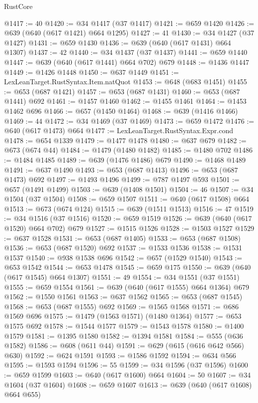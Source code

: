 \begin{lexlean}{RustCore}
\begin{coremodule}
@1417 := 40
@1420 := @34 @1417 (@37 @1417)
@1421 := @659 @1420
@1426 := @639 (@640 (@617 @1421) @664 @1295)
@1427 := 41
@1430 := @34 @1427 (@37 @1427)
@1431 := @659 @1430
@1436 := @639 (@640 (@617 @1431) @664 @1307)
@1437 := 42
@1440 := @34 @1437 (@37 @1437)
@1441 := @659 @1440
@1447 := @639 (@640 (@617 @1441) @664 @702) @679
@1448 := @1436 @1447
@1449 := @1426 @1448
@1450 := @637 @1449
@1451 := LexLeanTarget.RustSyntax.Item.natQuot
@1453 := @648 (@683 @1451)
@1455 := @653 (@687 @1421)
@1457 := @653 (@687 @1431)
@1460 := @653 (@687 @1441) @692
@1461 := @1457 @1460
@1462 := @1455 @1461
@1464 := @1453 @1462 @696
@1466 := @657 (@1450 @1464)
@1468 := @639 (@1416 @1466)
@1469 := 44
@1472 := @34 @1469 (@37 @1469)
@1473 := @659 @1472
@1476 := @640 (@617 @1473) @664
@1477 := LexLeanTarget.RustSyntax.Expr.cond
@1478 := @654 @1339
@1479 := @1477 @1478
@1480 := @637 @679
@1482 := @673 (@674 @44)
@1484 := @1479 (@1480 @1482)
@1485 := @1480 @702
@1486 := @1484 @1485
@1489 := @639 (@1476 @1486) @679
@1490 := @1468 @1489
@1491 := @637 @1490
@1493 := @653 (@687 @1413)
@1496 := @653 (@687 @1473) @692
@1497 := @1493 @1496
@1499 := @787 @1497 @593
@1501 := @657 (@1491 @1499)
@1503 := @639 (@1408 @1501)
@1504 := 46
@1507 := @34 @1504 (@37 @1504)
@1508 := @659 @1507
@1511 := @640 (@617 @1508) @664
@1513 := @673 (@674 @124)
@1515 := @639 (@1511 @1513)
@1516 := 47
@1519 := @34 @1516 (@37 @1516)
@1520 := @659 @1519
@1526 := @639 (@640 (@617 @1520) @664 @702) @679
@1527 := @1515 @1526
@1528 := @1503 @1527
@1529 := @637 @1528
@1531 := @653 (@687 @1405)
@1533 := @653 (@687 @1508)
@1536 := @653 (@687 @1520) @692
@1537 := @1533 @1536
@1538 := @1531 @1537
@1540 := @938 @1538 @696
@1542 := @657 (@1529 @1540)
@1543 := @653 @1542
@1544 := @653 @1478
@1545 := @659 @175
@1550 := @639 (@640 (@617 @1545) @664 @1307)
@1551 := 49
@1554 := @34 @1551 (@37 @1551)
@1555 := @659 @1554
@1561 := @639 (@640 (@617 @1555) @664 @1364) @679
@1562 := @1550 @1561
@1563 := @637 @1562
@1565 := @653 (@687 @1545)
@1568 := @653 (@687 @1555) @692
@1569 := @1565 @1568
@1571 := @686 @1569 @696
@1575 := @1479 (@1563 @1571) (@1480 @1364)
@1577 := @653 @1575 @692
@1578 := @1544 @1577
@1579 := @1543 @1578
@1580 := @1400 @1579
@1581 := @1395 @1580
@1582 := @1394 @1581
@1584 := @555 (@636 @1582)
@1586 := @608 (@611 @44)
@1591 := @629 (@615 (@616 @642 @566) @630)
@1592 := @624 @1591
@1593 := @1586 @1592
@1594 := @634 @566
@1595 := @1593 @1594
@1596 := 55
@1599 := @34 @1596 (@37 @1596)
@1600 := @659 @1599
@1603 := @640 (@617 @1600) @664
@1604 := 50
@1607 := @34 @1604 (@37 @1604)
@1608 := @659 @1607
@1613 := @639 (@640 (@617 @1608) @664 @655)

\end{coremodule}
\end{lexlean}
